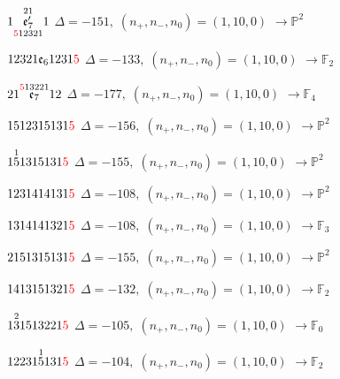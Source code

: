 \documentclass[10pt]{article}
\begin{document}
$1\overset{21}{\underset{\textcolor{red}{5}12321}{\mathfrak{e}_7'}}1$ \quad $\Delta=-151,\; (n_+,n_-,n_0)=(1,10,0)$ \quad $\to \mathbb{P}^2$

\smallskip

$12321\mathfrak{e}_61231\textcolor{red}{5}$ \quad $\Delta=-133,\; (n_+,n_-,n_0)=(1,10,0)$ \quad $\to \mathbb{F}_{2}$

\smallskip

$21\overset{\textcolor{red}{5}13221}{\mathfrak{e}_7}12$ \quad $\Delta=-177,\; (n_+,n_-,n_0)=(1,10,0)$ \quad $\to \mathbb{F}_{4}$

\smallskip

$1512315131\textcolor{red}{5}$ \quad $\Delta=-156,\; (n_+,n_-,n_0)=(1,10,0)$ \quad $\to \mathbb{P}^2$

\smallskip

$1\overset{1}{5}1315131\textcolor{red}{5}$ \quad $\Delta=-155,\; (n_+,n_-,n_0)=(1,10,0)$ \quad $\to \mathbb{P}^2$

\smallskip

$1231414131\textcolor{red}{5}$ \quad $\Delta=-108,\; (n_+,n_-,n_0)=(1,10,0)$ \quad $\to \mathbb{P}^2$

$1314141321\textcolor{red}{5}$ \quad $\Delta=-108,\; (n_+,n_-,n_0)=(1,10,0)$ \quad $\to \mathbb{F}_{3}$

\smallskip

$2151315131\textcolor{red}{5}$ \quad $\Delta=-155,\; (n_+,n_-,n_0)=(1,10,0)$ \quad $\to \mathbb{P}^2$

\smallskip

$1413151321\textcolor{red}{5}$ \quad $\Delta=-132,\; (n_+,n_-,n_0)=(1,10,0)$ \quad $\to \mathbb{F}_{2}$

\smallskip

$1\overset{2}{3}1513221\textcolor{red}{5}$ \quad $\Delta=-105,\; (n_+,n_-,n_0)=(1,10,0)$ \quad $\to \mathbb{F}_{0}$

\smallskip

$12231\overset{1}{5}131\textcolor{red}{5}$ \quad $\Delta=-104,\; (n_+,n_-,n_0)=(1,10,0)$ \quad $\to \mathbb{F}_{2}$
\end{document}
